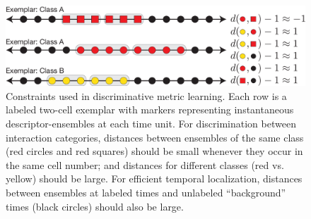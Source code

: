 \begin{figure}[t]
\begin{centering}
\includegraphics[width=\columnwidth]{metriclearning}
\end{centering}
\caption{Constraints used in discriminative metric learning. Each row is a labeled two-cell exemplar with markers representing instantaneous descriptor-ensembles at each time unit. For discrimination between interaction categories, distances between ensembles of the same class (red circles and red squares) should be small whenever they occur in the same cell number; and distances for different classes (red vs. yellow) should be large. For efficient temporal localization, distances between ensembles at labeled times and unlabeled ``background'' times (black circles) should also be large.}
\label{ML_illustration}
\end{figure}

